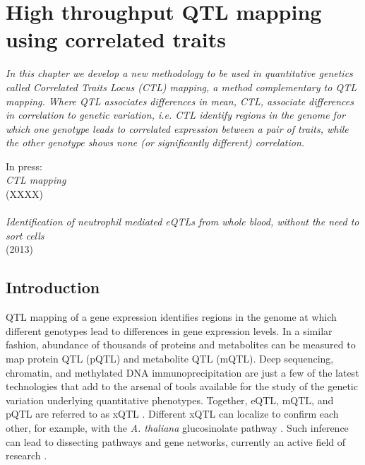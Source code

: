 \chapter{High throughput QTL mapping using correlated traits}
\thispagestyle{empty}
\label{chap:ctlmapping}

\emph{In this chapter we develop a new methodology to be used in quantitative genetics 
called Correlated Traits Locus (CTL) mapping, a method complementary to QTL mapping. 
Where QTL associates differences in mean, CTL, associate differences in correlation to 
genetic variation, i.e. CTL identify regions in the genome for which one genotype leads 
to correlated expression between a pair of traits, while the other genotype shows none 
(or significantly different) correlation.}

\null
\vfill

\begin{myexampleblock}{In press:}
  \\
  \emph{CTL mapping}\\
   (XXXX)\\
  \\
  \emph{Identification of neutrophil mediated eQTLs from whole blood, without the need to sort cells}\\
   (2013)
\end{myexampleblock}

\newpage

\section{Introduction}
  QTL mapping of a gene expression identifies regions in the genome at which different genotypes lead to differences in gene
  expression levels. In a similar fashion, abundance of thousands of proteins and metabolites can be measured to map protein 
  QTL (pQTL) and metabolite QTL (mQTL). 
  Deep sequencing, chromatin, and methylated DNA immunoprecipitation are just a few of the latest technologies that add to 
  the arsenal of tools available for the study of the genetic variation underlying quantitative phenotypes. Together, eQTL, 
  mQTL, and pQTL are referred to as xQTL \cite{Arends:2012}. Different xQTL can localize to confirm each other, for example, 
  with the \emph{A. thaliana} glucosinolate pathway \cite{Jansen:2009}. Such inference can lead to dissecting pathways and gene networks, 
  currently an active field of research \cite{Prins:2012}.


